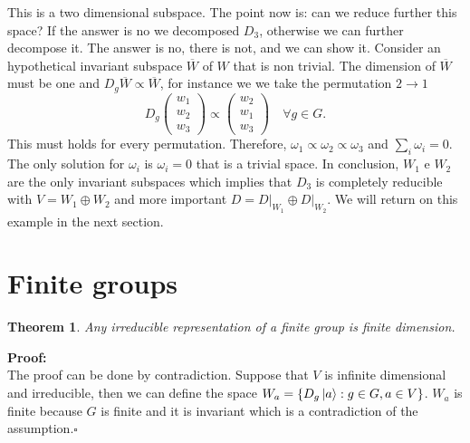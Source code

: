 \documentclass[12pt]{book}
\theoremstyle{plain}
\newtheorem{thm}{Theorem}[section]
\theoremstyle{definition}
\theoremstyle{remark}
\begin{document}
This is a two dimensional subspace. The point now is: can we reduce further this space? If the answer is no we decomposed $D_3$, otherwise we can further decompose it. The answer is no, there is not, and we can show it. Consider an hypothetical invariant subspace $\overline{W}$ of $W$ that is non trivial. The dimension of $\overline{W}$ must be one and $D_g\overline{W}\propto \overline{W}$, for instance we we take the permutation $2\to1$
\[D_g \begin{pmatrix}w_1\\w_2\\w_3\end{pmatrix} \propto \begin{pmatrix}w_2\\w_1\\w_3\end{pmatrix}\quad \forall g\in G.\]
This must holds for every permutation. Therefore, $\omega_1 \propto \omega_2\propto \omega_3$ and $\sum_i \omega_i = 0$. The only solution for $\omega_i$ is $\omega_i =0$ that is a trivial space. In conclusion, $W_1$ e $W_2$ are the only invariant subspaces which implies that $D_3$ is completely reducible with $V = W_1 \oplus W_2$ and more important $D = D\big|_{W_1} \oplus D\big|_{W_2}$. We will return on this example in the next section.
\section{Finite groups}
\begin{thm}
Any irreducible representation of a finite group is finite dimension.
\end{thm}
\hspace{-1.4em}\textbf{Proof:}\\
The proof can be done by contradiction. Suppose that $V$ is infinite dimensional and irreducible, then we can define the space $W_a = \{D_g \ket{a}:g\in G,a\in V\}$. $W_a$ is finite because $G$ is finite and it is invariant which is a contradiction of the assumption.\hfill\ensuremath{\square}\\
\end{document}
